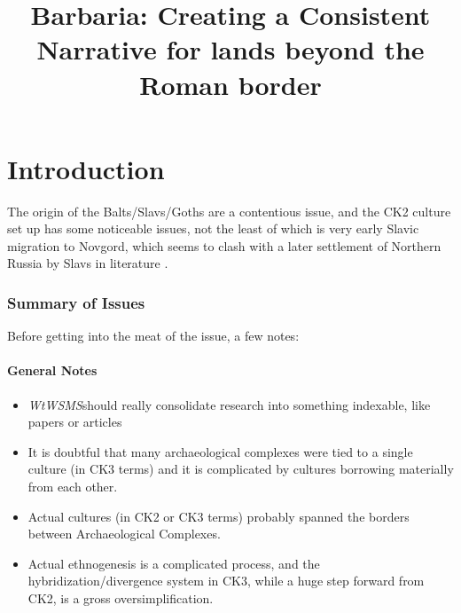 \documentclass{article}
\title{Barbaria: Creating a Consistent Narrative for lands beyond the Roman border}
\newcommand{\wtwsms}{\textit{WtWSMS}}
\begin{document}
	
	\maketitle
	
	\section{Introduction}
	\label{sec:intro}
	
	The origin of the Balts/Slavs/Goths are a contentious issue, and the CK2 culture set up has some noticeable issues, not the least of which is very early Slavic migration to Novgord, which seems to clash with a later settlement of Northern Russia by Slavs in literature \cite{EmergenceOfRussia}.
	
	\subsubsection{Summary of Issues}
	\label{sec:intro:subsec:summary}
	Before getting into the meat of the issue, a few notes:
	
	\paragraph{General Notes}
	\begin{itemize}
		\item \wtwsms should really consolidate research into something indexable, like papers or articles
		\item It is doubtful that many archaeological complexes were tied to a single culture (in CK3 terms) and it is complicated by cultures borrowing materially from each other.
		\item Actual cultures (in CK2 or CK3 terms) probably spanned the borders between Archaeological Complexes. 
		\item Actual ethnogenesis is a complicated process, and the hybridization/divergence system in CK3, while a huge step forward from CK2, is a gross oversimplification.
	\end{itemize}
	
\end{document}
